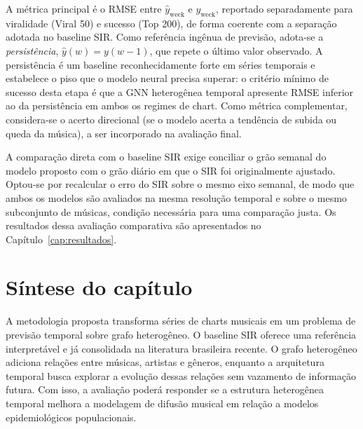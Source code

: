 A métrica principal é o RMSE entre $\hat{y}_{\text{week}}$ e $y_{\text{week}}$, reportado separadamente para viralidade (Viral 50) e sucesso (Top 200), de forma coerente com a separação adotada no baseline SIR. Como referência ingênua de previsão, adota-se a \emph{persistência}, $\hat{y}(w) = y(w-1)$, que repete o último valor observado. A persistência é um baseline reconhecidamente forte em séries temporais e estabelece o piso que o modelo neural precisa superar: o critério mínimo de sucesso desta etapa é que a GNN heterogênea temporal apresente RMSE inferior ao da persistência em ambos os regimes de chart. Como métrica complementar, considera-se o acerto direcional (se o modelo acerta a tendência de subida ou queda da música), a ser incorporado na avaliação final.

A comparação direta com o baseline SIR exige conciliar o grão semanal do modelo proposto com o grão diário em que o SIR foi originalmente ajustado. Optou-se por recalcular o erro do SIR sobre o mesmo eixo semanal, de modo que ambos os modelos são avaliados na mesma resolução temporal e sobre o mesmo subconjunto de músicas, condição necessária para uma comparação justa. Os resultados dessa avaliação comparativa são apresentados no Capítulo~\ref{cap:resultados}.



\section{Síntese do capítulo}

A metodologia proposta transforma séries de charts musicais em um problema de previsão temporal sobre grafo heterogêneo. O baseline SIR oferece uma referência interpretável e já consolidada na literatura brasileira recente. O grafo heterogêneo adiciona relações entre músicas, artistas e gêneros, enquanto a arquitetura temporal busca explorar a evolução dessas relações sem vazamento de informação futura. Com isso, a avaliação poderá responder se a estrutura heterogênea temporal melhora a modelagem de difusão musical em relação a modelos epidemiológicos populacionais.